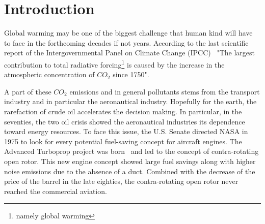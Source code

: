 
\chapter{Introduction}

Global warming may be one of the biggest challenge that human kind
will have to face in the forthcoming decades if not years.
According to the last scientific
report of the Intergovernmental Panel on Climate Change 
(IPCC)~\cite{IPCC2013}
"The largest contribution to total radiative 
forcing\footnote{namely global warming} 
is caused by the increase in the atmospheric 
concentration of $CO_2$ since 1750".

A part of these $CO_2$ emissions and in general pollutants stems from the
transport industry and in particular the
aeronautical industry. 
Hopefully for the earth,
the rarefaction of crude oil accelerates the decision making.
In particular, in the seventies, the two oil crisis showed the aeronautical 
industries its dependence toward energy resources. 
To face this issue, the U.S. Senate directed NASA in 1975
to look for every potential fuel-saving concept for aircraft
engines. The Advanced Turboprop
project was born~\cite{Hager1988} and led to the
concept of contra-rotating open rotor. This new
engine concept showed large fuel savings
along with higher noise emissions due to the absence of
a duct. Combined with the decrease of the price of the
barrel in the late eighties, the contra-rotating open rotor 
never reached the commercial aviation.

